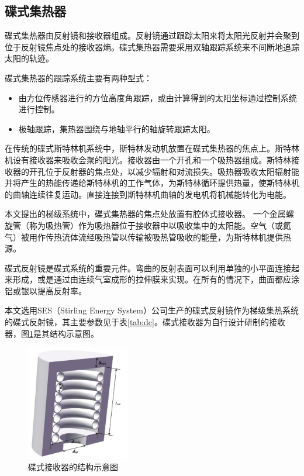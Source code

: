 \subsection{碟式集热器}
\label{sec:pdc}

碟式集热器由反射镜和接收器组成。反射镜通过跟踪太阳来将太阳光反射并会聚到位于反射镜焦点处的接收器熵。碟式集热器需要采用双轴跟踪系统来不间断地追踪太阳的轨迹。

碟式集热器的跟踪系统主要有两种型式：\cite{Adkins1987}
\begin{itemize}
  \item 由方位传感器进行的方位高度角跟踪，或由计算得到的太阳坐标通过控制系统进行控制。
  \item 极轴跟踪，集热器围绕与地轴平行的轴旋转跟踪太阳。
\end{itemize}

在传统的碟式斯特林机系统中，斯特林发动机放置在碟式集热器的焦点上。斯特林机设有接收器来吸收会聚的阳光。接收器由一个开孔和一个吸热器组成。斯特林接收器的开孔位于反射器的焦点处，以减少辐射和对流损失。吸热器吸收太阳辐射能并将产生的热能传递给斯特林机的工作气体，为斯特林循环提供热量，使斯特林机的曲轴连续往复运动。直接连接到斯特林机曲轴的发电机将机械能转化为电能。

本文提出的梯级系统中，碟式集热器的焦点处放置有腔体式接收器。 一个金属螺旋管（称为吸热管）作为吸热器位于接收器中以吸收集中的太阳能。空气（或氮气）被用作传热流体流经吸热管以传输被吸热管吸收的能量，为斯特林机提供热源。

碟式反射镜是碟式系统的重要元件。弯曲的反射表面可以利用单独的小平面连接起来形成，或是通过由连续气室成形的拉伸膜来实现。在所有的情况下，曲面都应涂铝或银以提高反射率。

本文选用SES（Stirling Energy System）公司生产的碟式反射镜作为梯级集热系统的碟式反射镜，其主要参数见于表\ref{tab:dc}。碟式接收器为自行设计研制的接收器，图\ref{fig:dishReceiver}是其结构示意图。

\begin{figure}[!ht]
\centering
\includegraphics[width=0.4\textwidth]{fig/DishReceiver.pdf}
\caption{碟式接收器的结构示意图}\label{fig:dishReceiver}
\end{figure}

